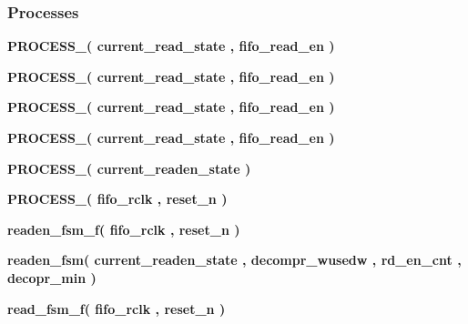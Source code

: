 \subsubsection*{Processes}
 \begin{DoxyCompactItemize}
\item 
{\bf P\+R\+O\+C\+E\+S\+S\+\_}{\bfseries  ( {\bfseries {\bfseries {\bf current\+\_\+read\+\_\+state}} \textcolor{vhdlchar}{ }} , {\bfseries {\bfseries {\bf fifo\+\_\+read\+\_\+en}} \textcolor{vhdlchar}{ }} )}
\item 
{\bf P\+R\+O\+C\+E\+S\+S\+\_}{\bfseries  ( {\bfseries {\bfseries {\bf current\+\_\+read\+\_\+state}} \textcolor{vhdlchar}{ }} , {\bfseries {\bfseries {\bf fifo\+\_\+read\+\_\+en}} \textcolor{vhdlchar}{ }} )}
\item 
{\bf P\+R\+O\+C\+E\+S\+S\+\_}{\bfseries  ( {\bfseries {\bfseries {\bf current\+\_\+read\+\_\+state}} \textcolor{vhdlchar}{ }} , {\bfseries {\bfseries {\bf fifo\+\_\+read\+\_\+en}} \textcolor{vhdlchar}{ }} )}
\item 
{\bf P\+R\+O\+C\+E\+S\+S\+\_}{\bfseries  ( {\bfseries {\bfseries {\bf current\+\_\+read\+\_\+state}} \textcolor{vhdlchar}{ }} , {\bfseries {\bfseries {\bf fifo\+\_\+read\+\_\+en}} \textcolor{vhdlchar}{ }} )}
\item 
{\bf P\+R\+O\+C\+E\+S\+S\+\_}{\bfseries  ( {\bfseries {\bfseries {\bf current\+\_\+readen\+\_\+state}} \textcolor{vhdlchar}{ }} )}
\item 
{\bf P\+R\+O\+C\+E\+S\+S\+\_}{\bfseries  ( {\bfseries {\bfseries {\bf fifo\+\_\+rclk}} \textcolor{vhdlchar}{ }} , {\bfseries {\bfseries {\bf reset\+\_\+n}} \textcolor{vhdlchar}{ }} )}
\item 
{\bf readen\+\_\+fsm\+\_\+f}{\bfseries  ( {\bfseries {\bfseries {\bf fifo\+\_\+rclk}} \textcolor{vhdlchar}{ }} , {\bfseries {\bfseries {\bf reset\+\_\+n}} \textcolor{vhdlchar}{ }} )}
\item 
{\bf readen\+\_\+fsm}{\bfseries  ( {\bfseries {\bfseries {\bf current\+\_\+readen\+\_\+state}} \textcolor{vhdlchar}{ }} , {\bfseries {\bfseries {\bf decompr\+\_\+wusedw}} \textcolor{vhdlchar}{ }} , {\bfseries {\bfseries {\bf rd\+\_\+en\+\_\+cnt}} \textcolor{vhdlchar}{ }} , {\bfseries {\bfseries {\bf decopr\+\_\+min}} \textcolor{vhdlchar}{ }} )}
\item 
{\bf read\+\_\+fsm\+\_\+f}{\bfseries  ( {\bfseries {\bfseries {\bf fifo\+\_\+rclk}} \textcolor{vhdlchar}{ }} , {\bfseries {\bfseries {\bf reset\+\_\+n}} \textcolor{vhdlchar}{ }} )}
\item 

\end{DoxyCompactItemize}

